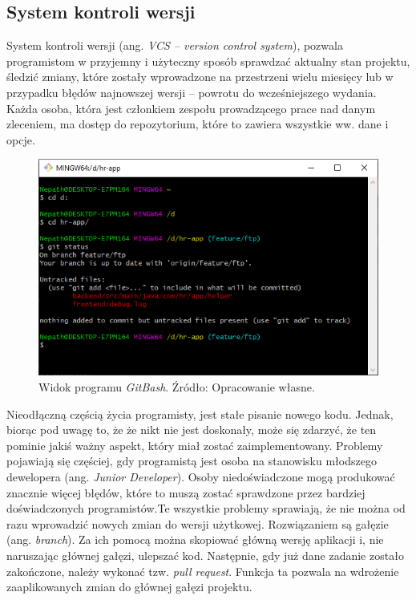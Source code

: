 \documentclass[twoside]{projektInzynierskiMS}
\numberwithin{figure}{section}
\begin{document}
\subsection{System kontroli wersji}
System kontroli wersji (ang. \textit{VCS -- version control system}), pozwala programistom w przyjemny i użyteczny sposób sprawdzać aktualny stan projektu, śledzić zmiany, które zostały wprowadzone na przestrzeni wielu miesięcy lub w przypadku błędów najnowszej wersji -- powrotu do wcześniejszego wydania. Każda osoba, która jest członkiem zespołu prowadzącego prace nad danym zleceniem, ma dostęp do repozytorium, które to zawiera wszystkie ww. dane i opcje. 

\begin{figure}[h!]
  \centering
  \includegraphics[scale=0.9]{images/gitbash.png}
    \caption{Widok programu \textit{GitBash}. Źródło: Opracowanie własne.}
    \label{fig:gitbash}
\end{figure}
\newpage
Nieodłączną częścią życia programisty, jest stałe pisanie nowego kodu. Jednak, biorąc pod uwagę to, że że nikt nie jest doskonały, może się zdarzyć, że ten pominie jakiś ważny aspekt, który miał zostać zaimplementowany. Problemy pojawiają się częściej, gdy programistą jest osoba na stanowisku młodszego dewelopera (ang. \textit{Junior  Developer}). Osoby niedoświadczone mogą produkować znacznie więcej błędów, które to muszą zostać sprawdzone przez bardziej doświadczonych programistów.\linebreak Te wszystkie problemy sprawiają, że nie można od razu wprowadzić nowych zmian do wersji użytkowej. Rozwiązaniem są gałęzie (ang. \textit{branch}). Za ich pomocą można skopiować główną wersję aplikacji i, nie naruszając głównej gałęzi, ulepszać kod. Następnie, gdy już dane zadanie zostało zakończone, należy wykonać tzw. \textit{pull request}. Funkcja ta pozwala na wdrożenie zaaplikowanych zmian do głównej gałęzi projektu.
\end{document}
